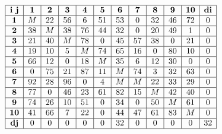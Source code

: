 \documentclass[17pt]{extarticle}
\begin{document}
\[
    \begin{array}{|c|c|c|c|c|c|c|c|c|c|c|c|}
        \hline
        \textbf{i j} & \textbf{1} & \textbf{2} & \textbf{3} & \textbf{4} & \textbf{5} & \textbf{6} & \textbf{7} & \textbf{8} & \textbf{9} & \textbf{10} & \textbf{di} \\
        \hline
        \textbf{1}   & M          & 22         & 56         & 6          & 51         & 53         & 0          & 32         & 46         & 72          & 0           \\
        \hline
        \textbf{2}   & 38         & M          & 38         & 76         & 44         & 32         & 0          & 20         & 49         & 1           & 0           \\
        \hline
        \textbf{3}   & 21         & 40         & M          & 78         & 0          & 45         & 57         & 38         & 0          & 21          & 0           \\
        \hline
        \textbf{4}   & 19         & 10         & 5          & M          & 74         & 65         & 16         & 0          & 80         & 10          & 0           \\
        \hline
        \textbf{5}   & 66         & 12         & 0          & 18         & M          & 35         & 6          & 12         & 30         & 0           & 0           \\
        \hline
        \textbf{6}   & 0          & 75         & 21         & 87         & 11         & M          & 74         & 3          & 32         & 63          & 0           \\
        \hline
        \textbf{7}   & 92         & 28         & 96         & 0          & 4          & M          & M          & 22         & 33         & 29          & 0           \\
        \hline
        \textbf{8}   & 77         & 0          & 46         & 23         & 61         & 82         & 15         & M          & 42         & 40          & 0           \\
        \hline
        \textbf{9}   & 74         & 26         & 10         & 51         & 0          & 34         & 0          & 50         & M          & 61          & 0           \\
        \hline
        \textbf{10}  & 41         & 66         & 7          & 22         & 0          & 44         & 47         & 61         & 83         & M           & 0           \\
        \hline
        \textbf{dj}  & 0          & 0          & 0          & 0          & 0          & 32         & 0          & 0          & 0          & 0           & 32          \\
        \hline
    \end{array}
\]
\end{document}
